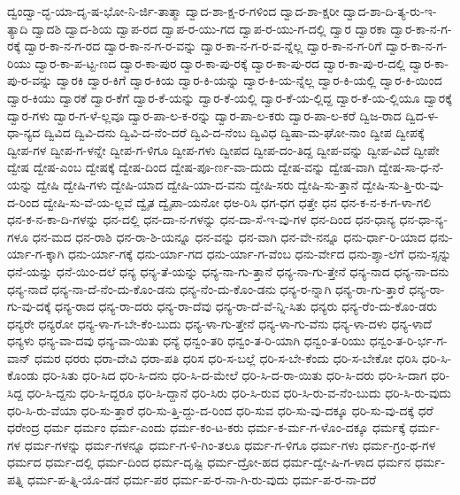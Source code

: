 {ದ್ವಂದ್ವಾ-ದ್ಭ-ಯಾ-ದೃ-ಷ-ಭೋ-ನಿ-ರ್ಜಿ-ತಾತ್ಮಾ
ದ್ವಾದ-ಶಾ-ಕ್ಷ-ರ-ಗಳಿಂದ
ದ್ವಾದ-ಶಾ-ಕ್ಷರೀ
ದ್ವಾದ-ಶಾ-ದಿ-ತ್ಯ-ರು-ಇ-ತ್ಯಾದಿ
ದ್ವಾದಶಿ
ದ್ವಾದ-ಶಿಯ
ದ್ವಾಪ-ರದ
ದ್ವಾಪ-ರ-ಯು-ಗದ
ದ್ವಾಪ-ರ-ಯು-ಗ-ದಲ್ಲಿ
ದ್ವಾರ
ದ್ವಾರಕಾ
ದ್ವಾರ-ಕಾ-ನ-ಗ-ರಕ್ಕೆ
ದ್ವಾರ-ಕಾ-ನ-ಗ-ರದ
ದ್ವಾರ-ಕಾ-ನ-ಗ-ರ-ವನ್ನು
ದ್ವಾರ-ಕಾ-ನ-ಗ-ರ-ವ-ನ್ನೆಲ್ಲ
ದ್ವಾರ-ಕಾ-ನ-ಗ-ರಿಗೆ
ದ್ವಾರ-ಕಾ-ನ-ಗ-ರಿಯು
ದ್ವಾರ-ಕಾ-ಪ-ಟ್ಟ-ಣದ
ದ್ವಾರ-ಕಾ-ಪುರ
ದ್ವಾರ-ಕಾ-ಪು-ರಕ್ಕೆ
ದ್ವಾರ-ಕಾ-ಪು-ರದ
ದ್ವಾರ-ಕಾ-ಪು-ರ-ದಲ್ಲಿ
ದ್ವಾರ-ಕಾ-ಪು-ರ-ವನ್ನು
ದ್ವಾರಕಿ
ದ್ವಾರ-ಕಿಗೆ
ದ್ವಾರ-ಕಿಯ
ದ್ವಾರ-ಕಿ-ಯನ್ನು
ದ್ವಾರ-ಕಿ-ಯ-ನ್ನೆಲ್ಲ
ದ್ವಾರ-ಕಿ-ಯಲ್ಲಿ
ದ್ವಾರ-ಕಿ-ಯಿಂದ
ದ್ವಾರ-ಕಿಯು
ದ್ವಾರಕೆ
ದ್ವಾರ-ಕೆಗೆ
ದ್ವಾರ-ಕೆ-ಯನ್ನು
ದ್ವಾರ-ಕೆ-ಯಲ್ಲಿ
ದ್ವಾರ-ಕೆ-ಯ-ಲ್ಲಿದ್ದ
ದ್ವಾರ-ಕೆ-ಯ-ಲ್ಲಿಯೂ
ದ್ವಾರಕ್ಕೆ
ದ್ವಾರ-ಗಳು
ದ್ವಾರ-ಗ-ಳೆ-ಲ್ಲವೂ
ದ್ವಾರ-ಪಾ-ಲ-ಕ-ರನ್ನು
ದ್ವಾರ-ಪಾ-ಲ-ಕರು
ದ್ವಾರ-ಪಾ-ಲ-ಕರೆ
ದ್ವಿಜ-ರಾದ
ದ್ವಿದ-ಳ-ಧಾ-ನ್ಯದ
ದ್ವಿವಿದ
ದ್ವಿವಿ-ದನು
ದ್ವಿವಿ-ದ-ನೆಂ-ದರೆ
ದ್ವಿವಿ-ದ-ನೆಂಬ
ದ್ವಿವಿಧ
ದ್ವಿಷಾ-ಮ-ಘೋ-ನಾಂ
ದ್ವೀಪ
ದ್ವೀಪಕ್ಕೆ
ದ್ವೀಪ-ಗಳ
ದ್ವೀಪ-ಗ-ಳನ್ನೇ
ದ್ವೀಪ-ಗ-ಳಿಗೂ
ದ್ವೀಪ-ಗಳು
ದ್ವೀಪದ
ದ್ವೀಪ-ದಂ-ತಿದ್ದ
ದ್ವೀಪ-ವನ್ನು
ದ್ವೀಪ-ವಿದೆ
ದ್ವೀಪೇ
ದ್ವೇಷ
ದ್ವೇಷ-ಎಂಬ
ದ್ವೇಷಕ್ಕೆ
ದ್ವೇಷ-ದಿಂದ
ದ್ವೇಷ-ಪೂ-ರ್ಣ-ವಾ-ದುದು
ದ್ವೇಷ-ವನ್ನು
ದ್ವೇಷ-ವಾಗಿ
ದ್ವೇಷ-ಸಾ-ಧ-ನೆ-ಯನ್ನು
ದ್ವೇಷಿ
ದ್ವೇಷಿ-ಗಳು
ದ್ವೇಷಿ-ಯಾದ
ದ್ವೇಷಿ-ಯಾ-ದ-ವನು
ದ್ವೇಷಿ-ಸರು
ದ್ವೇಷಿ-ಸು-ತ್ತಾನೆ
ದ್ವೇಷಿ-ಸು-ತ್ತಿ-ರು-ವು-ದ-ರಿಂದ
ದ್ವೇಷಿ-ಸು-ವೆ-ಯ-ಲ್ಲವೆ
ದ್ವೈತ
ದ್ವೈಪಾ-ಯನೋ
ಧಅ-ರಿಸಿ
ಧಗ-ಧಗ
ಧತ್ತೇ
ಧನ
ಧನ-ಕ-ನ-ಕ-ಗ-ಳಾ-ಗಲಿ
ಧನ-ಕ-ನ-ಕಾ-ದಿ-ಗಳನ್ನು
ಧನ-ದಲ್ಲಿ
ಧನ-ದಾ-ನ-ಗಳನ್ನು
ಧನ-ದಾ-ಸೆ-ಇ-ವು-ಗಳ
ಧನ-ದಿಂದ
ಧನ-ಧಾನ್ಯ
ಧನ-ಧಾ-ನ್ಯ-ಗಳೂ
ಧನ-ಮದ
ಧನ-ರಾಶಿ
ಧನ-ರಾ-ಶಿ-ಯನ್ನೂ
ಧನ-ವನ್ನು
ಧನ-ವಾಗಿ
ಧನ-ವೇ-ನನ್ನೂ
ಧನು-ರ್ಧಾ-ರಿ-ಯಾದ
ಧನು-ರ್ಯಾ-ಗ-ಕ್ಕಾಗಿ
ಧನು-ರ್ಯಾ-ಗಕ್ಕೆ
ಧನು-ರ್ಯಾ-ಗದ
ಧನು-ರ್ಯಾ-ಗ-ವೆಂಬ
ಧನು-ರ್ವೇದ
ಧನು-ಶ್ಶಾ-ಲೆಗೆ
ಧನು-ಸ್ಸನ್ನು
ಧನೆ-ಯನ್ನು
ಧನೆ-ಯಿಂ-ದಲೆ
ಧನ್ಯ
ಧನ್ಯ-ತೆ-ಯನ್ನು
ಧನ್ಯ-ನಾ-ಗು-ತ್ತಾನೆ
ಧನ್ಯ-ನಾ-ಗು-ತ್ತೇನೆ
ಧನ್ಯ-ನಾದ
ಧನ್ಯ-ನಾ-ದನು
ಧನ್ಯ-ನಾದೆ
ಧನ್ಯ-ನಾ-ದೆ-ನೆಂ-ದು-ಕೊಂ-ಡನು
ಧನ್ಯ-ನೆಂ-ದು-ಕೊಂ-ಡನು
ಧನ್ಯ-ರ-ನ್ನಾಗಿ
ಧನ್ಯ-ರಾ-ಗು-ತ್ತಾರೆ
ಧನ್ಯ-ರಾ-ಗು-ವು-ದಕ್ಕೆ
ಧನ್ಯ-ರಾದ
ಧನ್ಯ-ರಾ-ದರು
ಧನ್ಯ-ರಾ-ದೆವು
ಧನ್ಯ-ರಾ-ದೆ-ವೆ-ನ್ನಿ-ಸಿತು
ಧನ್ಯರು
ಧನ್ಯ-ರೆಂ-ದು-ಕೊಂ-ಡರು
ಧನ್ಯರೇ
ಧನ್ಯರೋ
ಧನ್ಯ-ಳಾ-ಗ-ಬೇ-ಕೆಂ-ಬುದು
ಧನ್ಯ-ಳಾ-ಗು-ತ್ತೇನೆ
ಧನ್ಯ-ಳಾ-ಗು-ವೆನು
ಧನ್ಯ-ಳಾ-ದಳು
ಧನ್ಯ-ಳಾದೆ
ಧನ್ಯಳು
ಧನ್ಯ-ವಾ-ದವು
ಧನ್ಯ-ವಾ-ಯಿತು
ಧನ್ಯೆ
ಧನ್ವಂ-ತರಿ
ಧನ್ವಂ-ತ-ರಿ-ಯಾಗಿ
ಧನ್ವಂ-ತ-ರಿಯು
ಧನ್ವಂ-ತ-ರಿ-ರ್ಭ-ಗ-ವಾನ್
ಧಮರ
ಧರರು
ಧರಾ-ದೇವಿ
ಧರಾ-ಪತಿ
ಧರಿಸ
ಧರಿ-ಸ-ಬಲ್ಲೆ
ಧರಿ-ಸ-ಬೇ-ಕೆಂದು
ಧರಿ-ಸ-ಬೇಕೋ
ಧರಿಸಿ
ಧರಿ-ಸಿ-ಕೊಂಡು
ಧರಿ-ಸಿತು
ಧರಿ-ಸಿದ
ಧರಿ-ಸಿ-ದನು
ಧರಿ-ಸಿ-ದ-ಮೇಲೆ
ಧರಿ-ಸಿ-ದ-ರಾ-ಯಿತು
ಧರಿ-ಸಿ-ದರು
ಧರಿ-ಸಿ-ದಾಗ
ಧರಿ-ಸಿದ್ದ
ಧರಿ-ಸಿ-ದ್ದನು
ಧರಿ-ಸಿ-ದ್ದರೂ
ಧರಿ-ಸಿ-ದ್ದಾನೆ
ಧರಿ-ಸಿರು
ಧರಿ-ಸಿ-ರುವ
ಧರಿ-ಸಿ-ರು-ವ-ನೆಂ-ಬುದು
ಧರಿ-ಸಿ-ರು-ವುದು
ಧರಿ-ಸಿ-ರು-ವೆಯಾ
ಧರಿ-ಸು-ತ್ತಾರೆ
ಧರಿ-ಸು-ತ್ತಿ-ದ್ದು-ದ-ರಿಂದ
ಧರಿ-ಸುವ
ಧರಿ-ಸು-ವು-ದಕ್ಕೂ
ಧರಿ-ಸು-ವು-ದಕ್ಕೆ
ಧರೆ
ಧರೇಂದ್ರ
ಧರ್ಮ
ಧರ್ಮಂ
ಧರ್ಮ-ಎಂದು
ಧರ್ಮ-ಕಂ-ಟ-ಕರು
ಧರ್ಮ-ಕ-ರ್ಮ-ಗ-ಳೊಂ-ದಕ್ಕೂ
ಧರ್ಮಕ್ಕೆ
ಧರ್ಮ-ಗಳ
ಧರ್ಮ-ಗಳನ್ನು
ಧರ್ಮ-ಗಳನ್ನೂ
ಧರ್ಮ-ಗ-ಳಿ-ಗಿಂ-ತಲೂ
ಧರ್ಮ-ಗ-ಳಿಗೂ
ಧರ್ಮ-ಗಳು
ಧರ್ಮ-ಗ್ರಂ-ಥ-ಗಳ
ಧರ್ಮದ
ಧರ್ಮ-ದಲ್ಲಿ
ಧರ್ಮ-ದಿಂದ
ಧರ್ಮ-ದೃಷ್ಟಿ
ಧರ್ಮ-ದ್ರೋ-ಹದ
ಧರ್ಮ-ದ್ವೇ-ಷಿ-ಗ-ಳಾದ
ಧರ್ಮನ
ಧರ್ಮ-ಪತ್ನಿ
ಧರ್ಮ-ಪ-ತ್ನಿ-ಯೊ-ಡನೆ
ಧರ್ಮ-ಪರ
ಧರ್ಮ-ಪ-ರ-ನಾ-ಗಿ-ರು-ವುದು
ಧರ್ಮ-ಪ-ರ-ನಾ-ದರೆ
}
